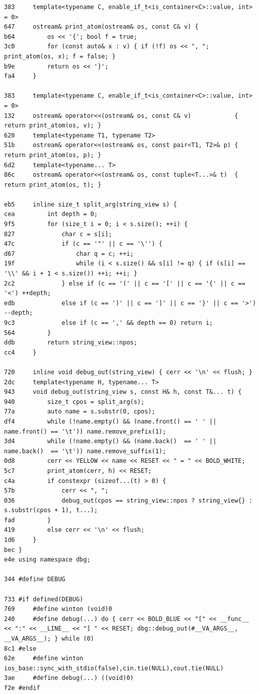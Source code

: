 \documentclass[11pt, a4paper, twoside]{article}
\begin{document}
{\begin{lstlisting}
383     template<typename C, enable_if_t<is_container<C>::value, int> = 0>
647     ostream& print_atom(ostream& os, const C& v) {
b64         os << '{'; bool f = true;
3c0         for (const auto& x : v) { if (!f) os << ", "; print_atom(os, x); f = false; }
b9e         return os << '}';
fa4     }
    
383     template<typename C, enable_if_t<is_container<C>::value, int> = 0>
132     ostream& operator<<(ostream& os, const C& v)            { return print_atom(os, v); }
620     template<typename T1, typename T2>
51b     ostream& operator<<(ostream& os, const pair<T1, T2>& p) { return print_atom(os, p); }
6d2     template<typename... T>
86c     ostream& operator<<(ostream& os, const tuple<T...>& t)  { return print_atom(os, t); }
    
eb5     inline size_t split_arg(string_view s) {
cea         int depth = 0;
9f5         for (size_t i = 0; i < s.size(); ++i) {
827             char c = s[i];
47c             if (c == '"' || c == '\'') {
d67                 char q = c; ++i;
19f                 while (i < s.size() && s[i] != q) { if (s[i] == '\\' && i + 1 < s.size()) ++i; ++i; }
2c2             } else if (c == '(' || c == '[' || c == '{' || c == '<') ++depth;
edb             else if (c == ')' || c == ']' || c == '}' || c == '>') --depth;
9c3             else if (c == ',' && depth == 0) return i;
564         }
ddb         return string_view::npos;
cc4     }
    
720     inline void debug_out(string_view) { cerr << '\n' << flush; }
2dc     template<typename H, typename... T>
943     void debug_out(string_view s, const H& h, const T&... t) {
940         size_t cpos = split_arg(s);
77a         auto name = s.substr(0, cpos);
df4         while (!name.empty() && (name.front() == ' ' || name.front() == '\t')) name.remove_prefix(1);
3d4         while (!name.empty() && (name.back()  == ' ' || name.back()  == '\t')) name.remove_suffix(1);
0d8         cerr << YELLOW << name << RESET << " = " << BOLD_WHITE;
5c7         print_atom(cerr, h) << RESET;
c4a         if constexpr (sizeof...(t) > 0) {
57b             cerr << ", ";
036             debug_out(cpos == string_view::npos ? string_view{} : s.substr(cpos + 1), t...);
fad         } 
419         else cerr << '\n' << flush;
1d6     }
bec }
e4e using namespace dbg;

344 #define DEBUG

733 #if defined(DEBUG)
769     #define winton (void)0
240     #define debug(...) do { cerr << BOLD_BLUE << "[" << __func__ << ":" << __LINE__ << "] " << RESET; dbg::debug_out(#__VA_ARGS__, __VA_ARGS__); } while (0)
8c1 #else
62e     #define winton ios_base::sync_with_stdio(false),cin.tie(NULL),cout.tie(NULL)
3ae     #define debug(...) ((void)0)
f2e #endif


\end{lstlisting}}
\end{document}
